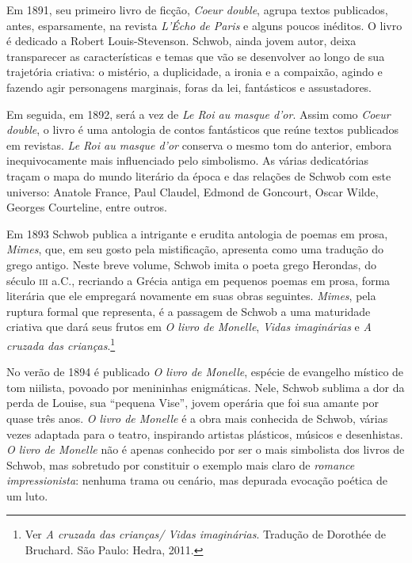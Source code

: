 Em 1891, seu primeiro livro de ficção, \textit{Coeur double}, agrupa textos
publicados, antes, esparsamente, na revista \textit{L’Écho}\textit{ de Paris} e
alguns poucos inéditos. O livro é dedicado a Robert Louis-Stevenson. Schwob,
ainda jovem autor, deixa transparecer as características e temas que vão se
desenvolver ao longo de sua trajetória criativa: o mistério, a duplicidade, a
ironia e a compaixão, agindo e fazendo agir personagens marginais, foras da
lei, fantásticos e assustadores.

Em seguida, em 1892, será a vez de \textit{Le Roi au masque d’or}. Assim
como \textit{Coeur double}, o livro é uma antologia de contos fantásticos que
reúne textos publicados em revistas. \textit{Le Roi
au masque d’or} conserva o mesmo tom do anterior, embora inequivocamente mais
influenciado pelo simbolismo. As várias dedicatórias traçam o mapa do mundo
literário da época e das relações de Schwob com este universo: Anatole France,
Paul Claudel, Edmond de Goncourt, Oscar Wilde, Georges Courteline, entre outros.

Em 1893 Schwob publica a intrigante e erudita antologia de poemas em prosa,
\textit{Mimes}, que, em seu gosto pela mistificação, apresenta como uma
tradução do grego antigo. Neste breve volume, Schwob imita o poeta grego
Herondas, do século \textsc{iii} a.C., recriando a Grécia antiga em pequenos poemas em
prosa, forma literária que ele empregará novamente em suas obras seguintes.
\textit{Mimes}, pela ruptura formal que representa, é a passagem de Schwob a uma 
maturidade criativa que
dará seus frutos em \textit{O livro de Monelle}, \textit{Vidas imaginárias} e 
\textit{A cruzada das crianças}.\footnote{ Ver \textit{A cruzada das crianças/ Vidas imaginárias}. 
Tradução de Dorothée de Bruchard. São Paulo: Hedra, 2011.}

No verão de 1894 é publicado \textit{O livro de Monelle},
espécie de evangelho místico de tom niilista, povoado por menininhas
enigmáticas. Nele, Schwob sublima a dor da perda de Louise, sua
“pequena Vise”, jovem operária que foi sua amante por quase três anos.
\textit{O livro de Monelle} é a obra mais conhecida de Schwob, várias vezes
adaptada para o teatro, inspirando artistas plásticos, músicos e desenhistas.
\textit{O livro de Monelle} não é apenas conhecido por ser o mais simbolista
dos livros de Schwob, mas sobretudo por constituir o exemplo mais claro de
\textit{romance impressionista}: nenhuma trama ou cenário, mas depurada
evocação poética de um luto.

